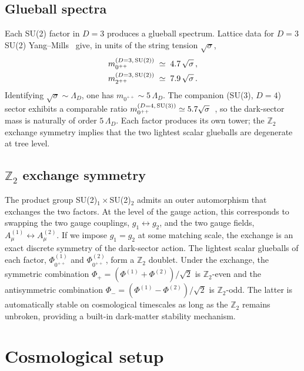 \documentclass[aps,prd,twocolumn,nofootinbib,superscriptaddress,floatfix]{revtex4-2}
\begin{document}
\subsection{Glueball spectra}
Each SU(2) factor in $D=3$ produces a glueball spectrum. Lattice data for $D=3$ SU(2) Yang--Mills~\cite{Teper1999,AthenodorouTeper2017} give, in units of the string tension $\sqrt{\sigma}$,
\begin{align}
    m_{0^{++}}^{(D=3,\,{\rm SU}(2))} &\;\simeq\; 4.7\,\sqrt{\sigma}\,, \\
    m_{2^{++}}^{(D=3,\,{\rm SU}(2))} &\;\simeq\; 7.9\,\sqrt{\sigma}\,.
\end{align}
Identifying $\sqrt{\sigma}\sim \Lambda_D$, one has $m_{0^{++}}\sim 5\,\Lambda_D$. The companion (SU(3), $D=4$) sector exhibits a comparable ratio $m_{0^{++}}^{(D=4,\,{\rm SU}(3))}\simeq 5.7\sqrt{\sigma}$~\cite{AthenodorouTeper2021}, so the dark-sector mass is naturally of order $5\,\Lambda_D$. Each factor produces its own tower; the $\mathbb{Z}_2$ exchange symmetry implies that the two lightest scalar glueballs are degenerate at tree level.

\subsection{$\mathbb{Z}_2$ exchange symmetry}
\label{sec:Z2}
The product group SU(2)$_1\times$SU(2)$_2$ admits an outer automorphism that exchanges the two factors. At the level of the gauge action, this corresponds to swapping the two gauge couplings, $g_1\leftrightarrow g_2$, and the two gauge fields, $A_\mu^{(1)} \leftrightarrow A_\mu^{(2)}$. If we impose $g_1=g_2$ at some matching scale, the exchange is an exact discrete symmetry of the dark-sector action. The lightest scalar glueballs of each factor, $\Phi^{(1)}_{0^{++}}$ and $\Phi^{(2)}_{0^{++}}$, form a $\mathbb{Z}_2$ doublet. Under the exchange, the symmetric combination $\Phi_+ = (\Phi^{(1)}+\Phi^{(2)})/\sqrt{2}$ is $\mathbb{Z}_2$-even and the antisymmetric combination $\Phi_- = (\Phi^{(1)}-\Phi^{(2)})/\sqrt{2}$ is $\mathbb{Z}_2$-odd. The latter is automatically stable on cosmological timescales as long as the $\mathbb{Z}_2$ remains unbroken, providing a built-in dark-matter stability mechanism.

\section{Cosmological setup}
\label{sec:cosmo}
\end{document}

